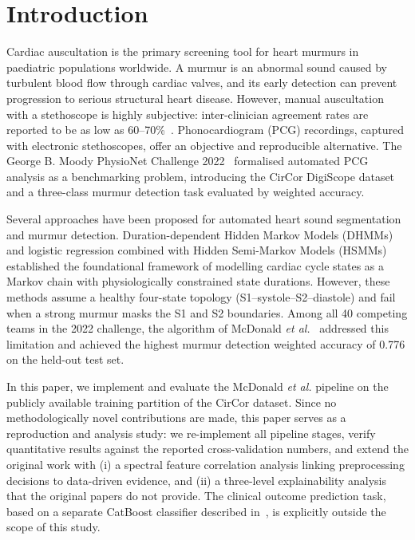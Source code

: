 \documentclass[conference]{IEEEtran}
\begin{document}
\section{Introduction}

Cardiac auscultation is the primary screening tool for heart murmurs
in paediatric populations worldwide. A murmur is an abnormal sound
caused by turbulent blood flow through cardiac valves, and its early
detection can prevent progression to serious structural heart disease.
However, manual auscultation with a stethoscope is highly subjective:
inter-clinician agreement rates are reported to be as low as
60--70\%~\cite{clifford2017}. Phonocardiogram (PCG) recordings, captured
with electronic stethoscopes, offer an objective and reproducible
alternative. The George B. Moody PhysioNet Challenge 2022~\cite{reyna2023}
formalised automated PCG analysis as a benchmarking problem, introducing
the CirCor DigiScope dataset and a three-class murmur detection task
evaluated by weighted accuracy.

Several approaches have been proposed for automated heart sound
segmentation and murmur detection. Duration-dependent Hidden Markov
Models (DHMMs)~\cite{schmidt2010} and logistic regression combined
with Hidden Semi-Markov Models (HSMMs)~\cite{springer2016} established
the foundational framework of modelling cardiac cycle states as a
Markov chain with physiologically constrained state durations. However,
these methods assume a healthy four-state topology (S1--systole--S2--diastole)
and fail when a strong murmur masks the S1 and S2 boundaries. Among
all 40 competing teams in the 2022 challenge, the algorithm of
McDonald \textit{et al.}~\cite{mcdonald2022,mcdonald2024} addressed
this limitation and achieved the highest murmur detection weighted
accuracy of 0.776 on the held-out test set.

In this paper, we implement and evaluate the McDonald \textit{et al.}
pipeline on the publicly available training partition of the CirCor
dataset. Since no methodologically novel contributions are made,
this paper serves as a reproduction and analysis study: we re-implement
all pipeline stages, verify quantitative results against the reported
cross-validation numbers, and extend the original work with (i) a
spectral feature correlation analysis linking preprocessing decisions
to data-driven evidence, and (ii) a three-level explainability analysis
that the original papers do not provide. The clinical outcome prediction
task, based on a separate CatBoost classifier described in~\cite{mcdonald2024},
is explicitly outside the scope of this study.
\end{document}
